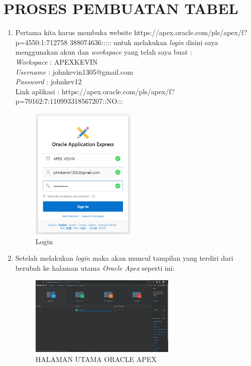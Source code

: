 \documentclass[a4paper, 12pt]{article}
\begin{document}
\section{PROSES PEMBUATAN TABEL}
\begin{enumerate}
\item Pertama kita harus membuka website
https://apex.oracle.com/pls/apex/f?p=4550:1:712758
388074636::::: untuk melakukan \textit{login} disini saya menggunakan akun dan \textit{workspace} yang telah saya buat : \\
\textit{Workspace}  : APEX\textunderscore KEVIN \\
\textit{Username}   : johnkevin1305@gmail.com \\
\textit{Password}   : johnkev12 \\
Link aplikasi       : 
https://apex.oracle.com/pls/apex/f?p=70162:7:110993318567207::NO:::
\begin{figure}[h]
\begin{center}
\includegraphics[width=5cm]{figure/Login.png}
\caption{Login}
\end{center}
\end{figure}

\item Setelah melakukan \textit{login} maka akan muncul tampilan yang terdiri dari berubah ke halaman utama \textit{Oracle Apex} seperti ini:

\begin{figure}[h]
\begin{center}
\includegraphics[width=7cm]{figure/T.png}
\caption{HALAMAN UTAMA ORACLE APEX}
\end{center}
\end{figure}


\end{enumerate}
\end{document}
